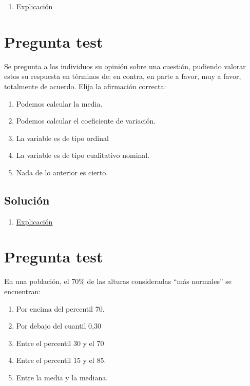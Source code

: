 \documentclass[
]{book}
\providecommand{\tightlist}{%
  \setlength{\itemsep}{0pt}\setlength{\parskip}{0pt}}
\begin{document}
\begin{enumerate}
\def\labelenumi{\alph{enumi})}
\tightlist
\item
  \href{https://1fjmanzano.github.io/bioestadistica/medidas-de-posicio\%CC\%81n-dispersio\%CC\%81n-y-forma.html\#medidas-de-posicio\%CC\%81n-centrales}{Explicación}
\end{enumerate}

\hypertarget{pregunta-test-38}{%
\section{Pregunta test}\label{pregunta-test-38}}

Se pregunta a los individuos su opinión sobre una cuestión, pudiendo valorar estos su respuesta en términos de: en contra, en parte a favor, muy a favor, totalmente de acuerdo. Elija la afirmación correcta:

\begin{enumerate}
\def\labelenumi{\alph{enumi})}
\tightlist
\item
  Podemos calcular la media.
\item
  Podemos calcular el coeficiente de variación.
\item
  La variable es de tipo ordinal
\item
  La variable es de tipo cualitativo nominal.
\item
  Nada de lo anterior es cierto.
\end{enumerate}

\hypertarget{soluciuxf3n-40}{%
\subsection{Solución}\label{soluciuxf3n-40}}

\begin{enumerate}
\def\labelenumi{\alph{enumi})}
\setcounter{enumi}{2}
\tightlist
\item
  \href{https://1fjmanzano.github.io/bioestadistica/tipos-de-variables.html}{Explicación}
\end{enumerate}

\hypertarget{pregunta-test-39}{%
\section{Pregunta test}\label{pregunta-test-39}}

En una población, el 70\% de las alturas consideradas ``más normales'' se encuentran:

\begin{enumerate}
\def\labelenumi{\alph{enumi})}
\tightlist
\item
  Por encima del percentil 70.
\item
  Por debajo del cuantil 0,30
\item
  Entre el percentil 30 y el 70
\item
  Entre el percentil 15 y el 85.
\item
  Entre la media y la mediana.
\end{enumerate}
\end{document}

